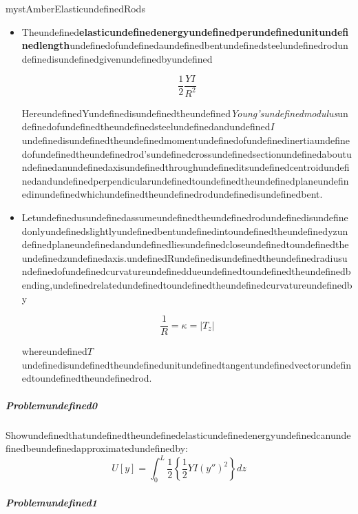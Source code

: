 \begin{mystadmonition}{mystAmber}{ElasticundefinedRods}\begin{itemize}
\item Theundefined\textbf{elasticundefinedenergyundefinedperundefinedunitundefinedlength}undefinedofundefinedaundefinedbentundefinedsteelundefinedrodundefinedisundefinedgivenundefinedbyundefined

\begin{equation}
\frac{1}{2}\frac{YI}{R^2}
\end{equation}


HereundefinedYundefinedisundefinedtheundefined\textit{Young'sundefinedmodulus}undefinedofundefinedtheundefinedsteelundefinedandundefined$I$undefinedisundefinedtheundefinedmomentundefinedofundefinedinertiaundefinedofundefinedtheundefinedrod'sundefinedcrossundefinedsectionundefinedaboutundefinedanundefinedaxisundefinedthroughundefineditsundefinedcentroidundefinedandundefinedperpendicularundefinedtoundefinedtheundefinedplaneundefinedinundefinedwhichundefinedtheundefinedrodundefinedisundefinedbent.
\end{itemize}

\begin{itemize}
\item Letundefinedusundefinedassumeundefinedtheundefinedrodundefinedisundefinedonlyundefinedslightlyundefinedbentundefinedintoundefinedtheundefinedyzundefinedplaneundefinedandundefinedliesundefinedcloseundefinedtoundefinedtheundefinedzundefinedaxis.undefinedRundefinedisundefinedtheundefinedradiusundefinedofundefinedcurvatureundefineddueundefinedtoundefinedtheundefinedbending,undefinedrelatedundefinedtoundefinedtheundefinedcurvatureundefinedby

\begin{equation}
\frac{1}{R}=\kappa = |T_z|
\end{equation}


whereundefined$T$undefinedisundefinedtheundefinedunitundefinedtangentundefinedvectorundefinedtoundefinedtheundefinedrod.
\end{itemize}

\subparagraph{Problemundefined0}

Showundefinedthatundefinedtheundefinedelasticundefinedenergyundefinedcanundefinedbeundefinedapproximatedundefinedby:
\begin{equation}
\boxed{U[y]=\int_0^L \frac12 \left\{ \frac{1}{2} YI(y'')^2 \right\}dz}
\end{equation}

\subparagraph{Problemundefined1}


\end{mystadmonition}
